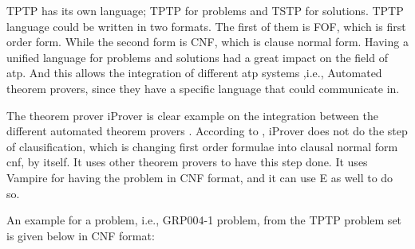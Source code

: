 TPTP has its own language; TPTP for problems and TSTP for solutions. TPTP language could be written in two formats. The first of them is FOF, which is first order form. While the second form is CNF, which is clause normal form. Having a unified language for problems and solutions had a great impact on the field of \ac{atp}. And this allows the integration of different \ac{atp} systems ,i.e., Automated theorem provers, since they have a specific language that could communicate in.  


The theorem prover iProver is clear example on the integration between the different automated theorem provers . According to \cite{korovin2013inst}, iProver does not do the step of clausification, which is changing first order formulae into clausal normal form \ac{cnf}, by itself. It uses other theorem provers to have this step done. It uses Vampire for having the problem in CNF format, and it can use E as well to do so. 


An example for a problem, i.e., GRP004-1 problem, from the TPTP problem set is given below in CNF format:

